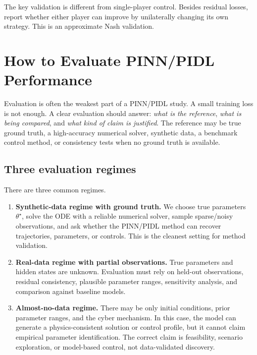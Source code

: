 \documentclass[11pt,a4paper]{article}
\begin{document}
The key validation is different from single-player control. Besides residual losses, report whether either player can improve by unilaterally changing its own strategy. This is an approximate Nash validation.



\section{How to Evaluate PINN/PIDL Performance}

Evaluation is often the weakest part of a PINN/PIDL study. A small training loss is not enough. A clear evaluation should answer: \emph{what is the reference}, \emph{what is being compared}, and \emph{what kind of claim is justified}. The reference may be true ground truth, a high-accuracy numerical solver, synthetic data, a benchmark control method, or consistency tests when no ground truth is available.

\subsection{Three evaluation regimes}
There are three common regimes.
\begin{enumerate}[leftmargin=2em]
    \item \textbf{Synthetic-data regime with ground truth.} We choose true parameters $\theta^\star$, solve the ODE with a reliable numerical solver, sample sparse/noisy observations, and ask whether the PINN/PIDL method can recover trajectories, parameters, or controls. This is the cleanest setting for method validation.
    \item \textbf{Real-data regime with partial observations.} True parameters and hidden states are unknown. Evaluation must rely on held-out observations, residual consistency, plausible parameter ranges, sensitivity analysis, and comparison against baseline models.
    \item \textbf{Almost-no-data regime.} There may be only initial conditions, prior parameter ranges, and the cyber mechanism. In this case, the model can generate a physics-consistent solution or control profile, but it cannot claim empirical parameter identification. The correct claim is feasibility, scenario exploration, or model-based control, not data-validated discovery.
\end{enumerate}
\end{document}
